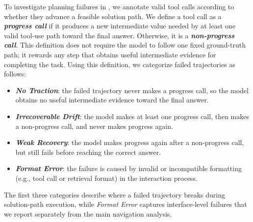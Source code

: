 To investigate planning failures in \bench{}, we annotate valid tool calls according to whether they advance a feasible solution path.
We define a tool call as a \textbf{\textit{progress call}} if it produces a new intermediate value needed by at least one valid tool-use path toward the final answer.
Otherwise, it is a \textbf{\textit{non-progress call}}.
This definition does not require the model to follow one fixed ground-truth path; it rewards any step that obtains useful intermediate evidence for completing the task.
Using this definition, we categorize failed trajectories as follows:
\begin{itemize}[topsep=2pt, partopsep=3pt, leftmargin=*, itemsep=-3pt]
\item \textbf{\textit{No Traction}}: the failed trajectory never makes a progress call, so the model obtains no useful intermediate evidence toward the final answer.
\item \textbf{\textit{Irrecoverable Drift}}: the model makes at least one progress call, then makes a non-progress call, and never makes progress again.
\item \textbf{\textit{Weak Recovery}}: the model makes progress again after a non-progress call, but still fails before reaching the correct answer.
\item \textbf{\textit{Format Error}}: the failure is caused by invalid or incompatible formatting (e.g., tool call or retrieval format) in the interaction process.
\end{itemize}
The first three categories describe where a failed trajectory breaks during solution-path execution, while \textit{Format Error} captures interface-level failures that we report separately from the main navigation analysis.





